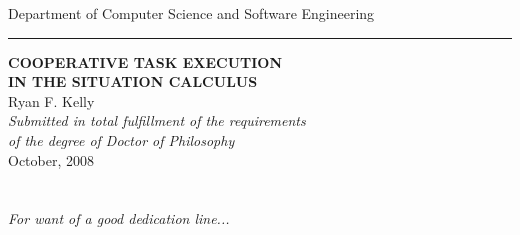 %
%
%
%





\begin{titlepage}
\begin{center}
{\Large Department of Computer Science and Software Engineering}\\ \vspace{0.1cm}
\rule{150mm}{0.5mm}

\vspace{1cm}
{\bf\LARGE  COOPERATIVE TASK EXECUTION }\\ \vspace{0.5cm} %
{\bf\LARGE  IN THE SITUATION CALCULUS } \\ %
\vspace{2cm}
{\LARGE      Ryan F. Kelly       }\\
\vspace{5cm}
{\em\large Submitted in total fulfillment of the requirements}\\ \vspace{0.1cm}
{\em\large        of the degree of Doctor of Philosophy     }\\
\vspace{0.5cm}
{\Large             October, 2008        }\\
\vspace{0.5cm}
\end{center}
\end{titlepage}
\cleardoublepage     %

\chapter*{ } %
\begin{center}
\emph{For want of a good dedication line...}
\end{center}





